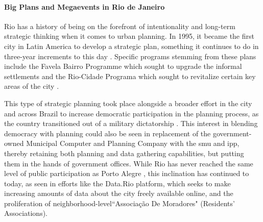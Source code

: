 \paragraph{Big Plans and Megaevents in Rio de Janeiro} \label{sec:rio-plans} \leavevmode\newline

Rio has a history of being on the forefront of intentionality and long-term strategic thinking when it comes to urban planning. In 1995, it became the first city in Latin America to develop a strategic plan, something it continues to do in three-year increments to this day \cite{prefeituradacidadedoriodejaneiroPLANOESTRATEGICOCIDADE2017}. Specific programs stemming from these plans include the Favela Bairro Programme which sought to upgrade the informal settlements and the Rio-Cidade Programa which sought to revitalize certain key areas of the city \cite{aciolyc.ReviewingUrbanRevitalisation2001}.

This type of strategic planning took place alongside a broader effort in the city and across Brazil to increase democratic participation in the planning process, as the country transitioned out of a military dictatorship \cite{aciolyc.ReviewingUrbanRevitalisation2001}. This interest in blending democracy with planning could also be seen in replacement of the government-owned Municipal Computer and Planning Company with the \ac{smu} and \ac{ipp}, thereby retaining both planning and data gathering capabilities, but putting them in the hands of government offices. While Rio has never reached the same level of public participation as Porto Alegre \cite{desousasantosParticipatoryBudgetingPorto1998}, this inclination has continued to today, as seen in efforts like the Data.Rio platform, which seeks to make increasing amounts of data about the city freely available online, and the proliferation of neighborhood-level``Associação De Moradores" (Residents' Associations).

